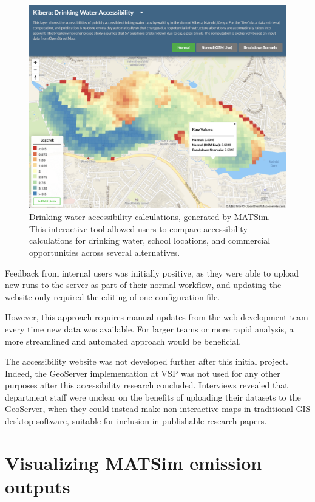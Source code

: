 \begin{figure}[!ht]
  \includegraphics[width=\textwidth]{chapters/12-server-experiments/images/nairobi.png}
  \caption[Drinking water accessibility calculations, generated by MATSim]{Drinking water accessibility calculations, generated by MATSim. This interactive tool allowed users to compare accessibility calculations for drinking water, school locations, and commercial opportunities across several alternatives.}
  \label{fig:nairobi}
\end{figure}

Feedback from internal users was initially positive, as they were able to upload new runs to the server as part of their normal workflow, and updating the website only required the editing of one configuration file.

However, this approach requires manual updates from the web development team every time new data was available. For larger teams or more rapid analysis, a more streamlined and automated approach would be beneficial.

The accessibility website was not developed further after this initial project. Indeed, the GeoServer implementation at VSP was not used for any other purposes after this accessibility research concluded. Interviews revealed that department staff were unclear on the benefits of uploading their datasets to the GeoServer, when they could instead make non-interactive maps in traditional GIS desktop software, suitable for inclusion in publishable research papers.

\hypertarget{server-experiments-emissions}{%
\section{Visualizing MATSim emission outputs}
\label{server-experiments-emissions}}

